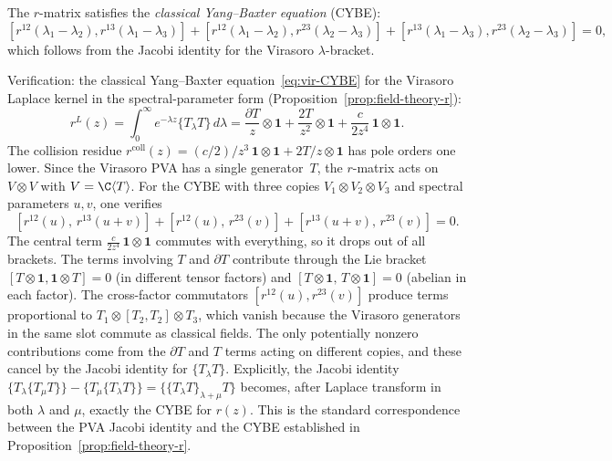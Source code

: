The $r$-matrix satisfies the \emph{classical Yang--Baxter equation} (CYBE):
\begin{equation}
[r^{12}(\lambda_1-\lambda_2), r^{13}(\lambda_1-\lambda_3)] + [r^{12}(\lambda_1-\lambda_2), r^{23}(\lambda_2-\lambda_3)] + [r^{13}(\lambda_1-\lambda_3), r^{23}(\lambda_2-\lambda_3)] = 0,
\end{equation}
which follows from the Jacobi identity for the Virasoro $\lambda$-bracket.

\begin{computation}
Verification: the classical Yang--Baxter equation~\eqref{eq:vir-CYBE}
for the Virasoro Laplace kernel in the spectral-parameter form
(Proposition~\ref{prop:field-theory-r}):
\[
r^L(z)
= \int_0^\infty e^{-\lambda z} \{T_\lambda T\}\,d\lambda
= \frac{\partial T}{z} \otimes \mathbf{1}
 + \frac{2T}{z^2} \otimes \mathbf{1}
 + \frac{c}{2z^4}\,\mathbf{1}\otimes\mathbf{1}.
\]
The collision residue $r^{\mathrm{coll}}(z) = (c/2)/z^3\,
\mathbf{1}\otimes\mathbf{1} + 2T/z\otimes\mathbf{1}$ has pole
orders one lower.
Since the Virasoro PVA has a single generator~$T$, the $r$-matrix
acts on $V \otimes V$ with $V = \C\langle T \rangle$.
For the CYBE with three copies $V_1 \otimes V_2 \otimes V_3$ and
spectral parameters $u, v$, one verifies
\[
[r^{12}(u),\, r^{13}(u+v)]
+ [r^{12}(u),\, r^{23}(v)]
+ [r^{13}(u+v),\, r^{23}(v)]
= 0.
\]
The central term $\frac{c}{2z^4}\,\mathbf{1}\otimes\mathbf{1}$
commutes with everything, so it drops out of all brackets.
The terms involving $T$ and $\partial T$ contribute through the
Lie bracket $[T \otimes \mathbf{1}, \mathbf{1} \otimes T] = 0$
(in different tensor factors) and
$[T \otimes \mathbf{1},\, T \otimes \mathbf{1}] = 0$ (abelian in
each factor). The cross-factor commutators
$[r^{12}(u), r^{23}(v)]$ produce terms proportional to
$T_1 \otimes [T_2, T_2] \otimes T_3$, which vanish because
the Virasoro generators in the same slot commute as classical
fields. The only potentially nonzero contributions come from the
$\partial T$ and $T$ terms acting on different copies, and these
cancel by the Jacobi identity for $\{T_\lambda T\}$.
Explicitly, the Jacobi identity
$\{T_\lambda\{T_\mu T\}\} - \{T_\mu\{T_\lambda T\}\}
= \{\{T_\lambda T\}_{\lambda+\mu} T\}$
becomes, after Laplace transform in both $\lambda$ and $\mu$,
exactly the CYBE for $r(z)$. This is the standard
correspondence between the PVA Jacobi identity and the CYBE
established in Proposition~\ref{prop:field-theory-r}.
\end{computation}

